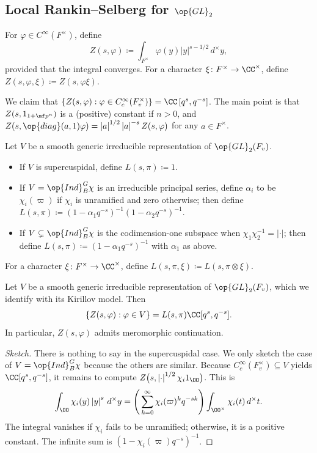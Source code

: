\documentclass{article}
\begin{document}
\subsection{Local Rankin--Selberg for \texorpdfstring{$\op{GL}_2$}{GL(2)}}
\begin{definition}
	For $\varphi\in C^\infty(F^\times)$, define
	\[Z(s,\varphi)\coloneqq\int_{F^\times}\varphi(y)\left|y\right|^{s-1/2}\,d^\times y,\]
	provided that the integral converges. For a character $\xi\colon F^\times\to\CC^\times$, define $Z(s,\varphi,\xi)\coloneqq Z(s,\varphi\xi)$.
\end{definition}
\begin{remark}
	We claim that $\{Z(s,\varphi):\varphi\in C_c^\infty(F_v^\times)\}=\CC\left[q^s,q^{-s}\right]$. The main point is that $Z(s,1_{1+\mf p^n})$ is a (positive) constant if $n>0$, and $Z(s,\op{diag}(a,1)\varphi)=\left|a\right|^{1/2}\left|a\right|^{-s}Z(s,\varphi)$ for any $a\in F^\times$.
\end{remark}
\begin{definition}
	Let $V$ be a smooth generic irreducible representation of $\op{GL}_2(F_v)$.
	\begin{itemize}
		\item If $V$ is supercuspidal, define $L(s,\pi)\coloneqq1$.
		\item If $V=\op{Ind}_B^G\chi$ is an irreducible principal series, define $\alpha_i$ to be $\chi_i(\varpi)$ if $\chi_i$ is unramified and zero otherwise; then define $L(s,\pi)\coloneqq(1-\alpha_1q^{-s})^{-1}(1-\alpha_2q^{-s})^{-1}$.
		\item If $V\subsetneq\op{Ind}_B^G\chi$ is the codimension-one subspace when $\chi_1\chi_2^{-1}=\left|\cdot\right|$; then define $L(s,\pi)\coloneqq(1-\alpha_1q^{-s})^{-1}$ with $\alpha_1$ as above.
	\end{itemize}
	For a character $\xi\colon F^\times\to\CC^\times$, define $L(s,\pi,\xi)\coloneqq L(s,\pi\otimes\xi)$.
\end{definition}
\begin{proposition}
	Let $V$ be a smooth generic irreducible representation of $\op{GL}_2(F_v)$, which we identify with its Kirillov model. Then
	\[\{Z(s,\varphi):\varphi\in V\}=L(s,\pi)\CC[q^s,q^{-s}].\]
	In particular, $Z(s,\varphi)$ admits meromorphic continuation.
\end{proposition}
\begin{proof}[Sketch]
	There is nothing to say in the supercuspidal case. We only sketch the case of $V=\op{Ind}_B^G\chi$ because the others are similar. Because $C_c^\infty(F_v^\times)\subseteq V$ yields $\CC[q^s,q^{-s}]$, it remains to compute $Z\big(s,\left|\cdot\right|^{1/2}\chi_i1_\OO\big)$. This is
	\[\int_\OO\chi_i(y)\left|y\right|^s\,d^\times y=\Bigg(\sum_{k=0}^\infty\chi_i(\varpi)^kq^{-sk}\Bigg)\int_{\OO^\times}\chi_i(t)\,d^\times t.\]
	The integral vanishes if $\chi_i$ fails to be unramified; otherwise, it is a positive constant. The infinite sum is $(1-\chi_i(\varpi)q^{-s})^{-1}$.
\end{proof}
\end{document}
